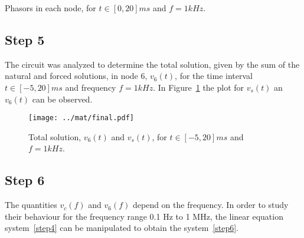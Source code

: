 \begin{table}[ht!]
  \centering
    
  \caption{Phasors in each node, for $t\in [0,20]ms$ and $f=1kHz$.}
  \label{tab:teo4}
\end{table}
\FloatBarrier





\vspace{-12pt}
\subsection{Step 5}
The circuit was analyzed to determine the total solution, given by the sum of the natural and forced solutions, in node 6, $v_6(t)$, for the time interval $t\in [-5,20]ms$ and frequency $f=1kHz$.
In Figure~\ref{fig:v6} the plot for $v_s(t)$ an $v_6(t)$ can be observed.


\begin{figure}[ht!]
  \centering
  \texttt{[image: ../mat/final.pdf]}
  \caption{Total solution, $v_{6}(t)$ and $v_{s}(t)$, for $t\in [-5,20]ms$ and $f=1kHz$.}
  \label{fig:v6}
\end{figure}
\FloatBarrier



\subsection{Step 6}
The quantities $v_c(f)$ and $v_6(f)$ depend on the frequency. In order to study their behaviour for the frequency range 0.1 Hz to 1 MHz, the linear equation system~\ref{step4} can be manipulated to obtain the system~\ref{step6}.

